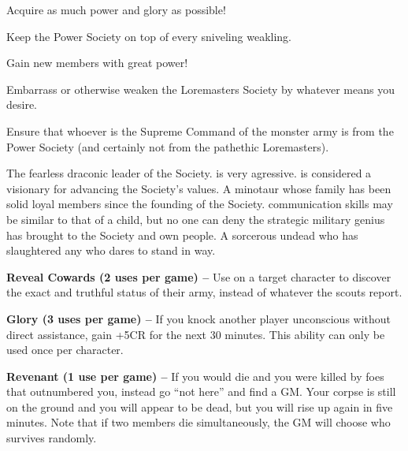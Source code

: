 \documentclass[blue]{guildcamp2}
\begin{document}
\begin{itemz}[Goals]
  \item Acquire as much power and glory as possible!
  \item Keep the Power Society on top of every sniveling weakling.
  \item Gain new members with great power!
  \item Embarrass or otherwise weaken the Loremasters Society by whatever means you desire.
    \item Ensure that whoever is the Supreme Command of the monster army is from the Power Society (and certainly not from the pathethic Loremasters).
\end{itemz}


\begin{members} 
  \member{\cRed{}} The fearless draconic leader of the Society. \cRed{\They} is very agressive. \cRed{\They} is considered a visionary for advancing the Society's values.
	\member{\cMinotaur{}} A minotaur whose family has been solid loyal members since the founding of the Society. \cMinotaur{\Their} communication skills may be similar to that of a child, but no one can deny the strategic military genius \cMinotaur{\they} has brought to the Society and \cMinotaur{\their} own people.
	\member{\cLich{}} A sorcerous undead who has slaughtered any who dares to stand in \cLich{\their} way.
\end{members}

\begin{itemz}
	\item \textbf{Reveal Cowards (2 uses per game) --} Use on a target character to discover the exact and truthful status of their army, instead of whatever the scouts report.
\item \textbf{Glory (3 uses per game) --} If you knock another player unconscious without direct assistance, gain +5CR for the next 30 minutes. This ability can only be used once per character.
	\item \textbf{Revenant (1 use per game) --} If you would die and you were killed by foes that outnumbered you, instead go ``not here'' and find a GM.  Your corpse is still on the ground and you will appear to be dead, but you will rise up again in five minutes. Note that if two members die simultaneously, the GM will choose who survives randomly.
\end{itemz}
\end{document}
